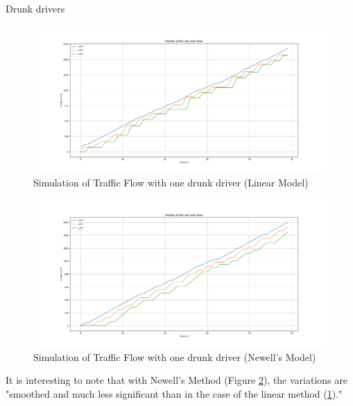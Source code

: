 \documentclass{beamer}
\begin{document}
\begin{frame}{Drunk drivers }
	\begin{minipage}{0.49\textwidth}
		\centering
		\begin{figure}
			\includegraphics[width=1.1\textwidth]{Model1W3C_O_Aco_D2_Linear.png}
			\caption{Simulation of Traffic Flow with one drunk driver (Linear Model)}
			\label{fig:DL}
		\end{figure}
	\end{minipage}\hfill
	\begin{minipage}{0.49\textwidth}
		\centering
		\begin{figure}
			\includegraphics[width=1.1\textwidth]{Model1W3C_O_Aco_D2_Newell.png}
			\caption{Simulation of Traffic Flow with one drunk driver (Newell's Model)}
			\label{fig:DN}
		\end{figure}
	\end{minipage}
	\begin{block}{}
		It is interesting to note that with Newell's Method (Figure \ref{fig:DN}), the variations are "smoothed and much less significant than in the case of the linear method (\ref{fig:DL})."
	\end{block}
\end{frame}
\end{document}
